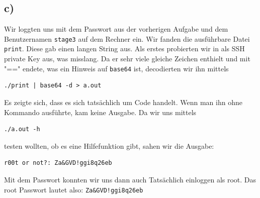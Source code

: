 \documentclass[10pt,a4paper]{article}
\begin{document}
\subsection*{c)}

Wir loggten uns mit dem Passwort aus der vorherigen Aufgabe und dem Benutzernamen \texttt{stage3} auf dem Rechner ein. Wir fanden die ausführbare Datei \texttt{print}. Diese gab einen langen String aus. 
Als erstes probierten wir in als SSH private Key aus, was misslang. Da er sehr viele gleiche Zeichen enthielt und mit "==" endete, was ein Hinweis auf \texttt{base64} ist, decodierten wir ihn mittels 
\begin{verbatim}
./print | base64 -d > a.out
\end{verbatim}
Es zeigte sich, dass es sich tatsächlich um Code handelt. 
Wenn man ihn ohne Kommando ausführte, kam keine Ausgabe. Da wir uns mittels 
\begin{verbatim}
./a.out -h
\end{verbatim}
testen wollten, ob es eine Hilfefunktion gibt, sahen wir die Ausgabe:
\begin{verbatim}
r00t or not?: Za&GVD!ggi8q26eb
\end{verbatim}
Mit dem Passwort konnten wir uns dann auch Tatsächlich einloggen als root. Das root Passwort lautet also:
\texttt{Za\&GVD!ggi8q26eb}
\end{document}
